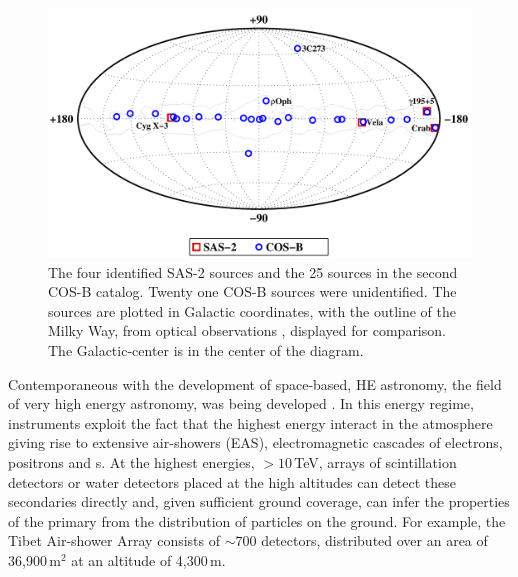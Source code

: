 \begin{figure}[t]
\includegraphics[angle=270,width=\textwidth]{plots/chap-introduction/2cg_catalog.pdf}
\caption{\label{FIG::INTRODUCTION::2CGCATALOG} The four identified SAS-2
sources and the 25 sources in the second COS-B catalog. Twenty one
COS-B sources were unidentified. The sources are plotted in Galactic
coordinates, with the outline of the Milky Way, from optical
observations \citep{REF::VIEIRA::2000}, displayed for comparison. The
Galactic-center is in the center of the diagram.}
\end{figure}

Contemporaneous with the development of space-based, HE \Gray
astronomy, the field of very high energy \Gray astronomy, was being
developed \citep{REF::WEEKES:BOOK2003}. In this energy regime,
instruments exploit the fact that the highest energy \Grays interact
in the atmosphere giving rise to extensive air-showers (EAS),
electromagnetic cascades of electrons, positrons and {\Grayc}s. At the
highest energies, $>10$\,TeV, arrays of scintillation detectors or
water \Cerenkov detectors placed at the high altitudes can detect
these secondaries directly and, given sufficient ground coverage, can
infer the properties of the primary from the distribution of particles
on the ground. For example, the Tibet Air-shower Array consists of
$\sim700$ detectors, distributed over an area of 36,900\,m$^2$ at an
altitude of 4,300\,m.

